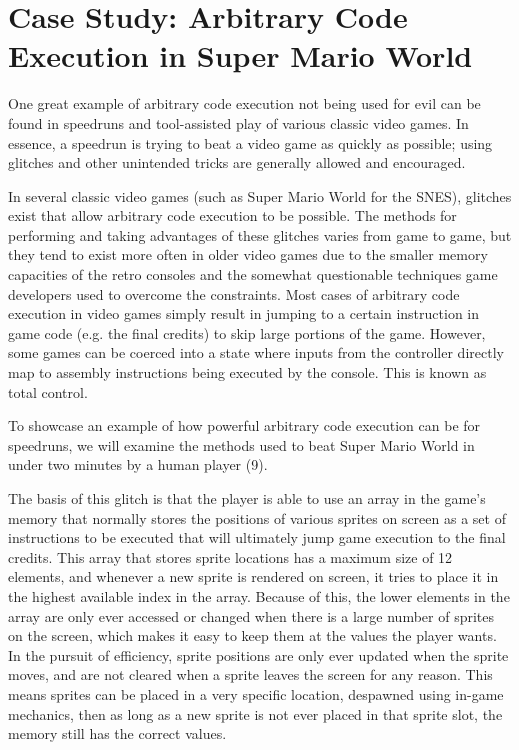 \section{Case Study: Arbitrary Code Execution in Super Mario World}

One great example of arbitrary code execution not being used for evil can be found in speedruns and tool-assisted play of various classic video games. In essence, a speedrun is trying to beat a video game as quickly as possible; using glitches and other unintended tricks are generally allowed and encouraged.

In several classic video games (such as Super Mario World for the SNES), glitches exist that allow arbitrary code execution to be possible. The methods for performing and taking advantages of these glitches varies from game to game, but they tend to exist more often in older video games due to the smaller memory capacities of the retro consoles and the somewhat questionable techniques game developers used to overcome the constraints. Most cases of arbitrary code execution in video games simply result in jumping to a certain instruction in game code (e.g. the final credits) to skip large portions of the game. However, some games can be coerced into a state where inputs from the controller directly map to assembly instructions being executed by the console. This is known as total control.

To showcase an example of how powerful arbitrary code execution can be for speedruns, we will examine the methods used to beat Super Mario World in under two minutes by a human player (9).

The basis of this glitch is that the player is able to use an array in the game’s memory that normally stores the positions of various sprites on screen as a set of instructions to be executed that will ultimately jump game execution to the final credits. This array that stores sprite locations has a maximum size of 12 elements, and whenever a new sprite is rendered on screen, it tries to place it in the highest available index in the array. Because of this, the lower elements in the array are only ever accessed or changed when there is a large number of sprites on the screen, which makes it easy to keep them at the values the player wants. In the pursuit of efficiency, sprite positions are only ever updated when the sprite moves, and are not cleared when a sprite leaves the screen for any reason. This means sprites can be placed in a very specific location, despawned using in-game mechanics, then as long as a new sprite is not ever placed in that sprite slot, the memory still has the correct values.

